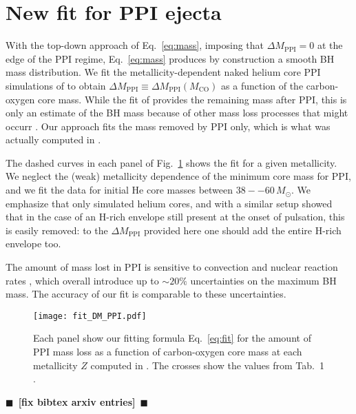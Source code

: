 \documentclass[twocolumn]{aastex63}
\DeclareRobustCommand{\Eqref}[1]{Eq.~\ref{#1}}
\DeclareRobustCommand{\Figref}[1]{Fig.~\ref{#1}}
\newcommand{\todo}[1]{{\large $\blacksquare$~\textbf{\color{red}[#1]}}~$\blacksquare$}
\begin{document}
\section{New fit for PPI ejecta}

With the top-down approach of \Eqref{eq:mass}, imposing that
$\Delta M_\mathrm{PPI}=0$ at the edge of the PPI regime,
\Eqref{eq:mass} produces by construction a smooth BH mass
distribution. We fit the metallicity-dependent naked helium core PPI
simulations of \cite{farmer:19} to obtain
$\Delta M_\mathrm{PPI} \equiv \Delta M_\mathrm{PPI}(M_\mathrm{CO})$ as
a function of the carbon-oxygen core mass. While the fit of
\cite{farmer:19} provides the remaining mass after PPI, this is only
an estimate of the BH mass because of other mass loss processes that
might occurr \citep[e.g.,][]{renzo:20csm, powell:21}. Our approach
fits the mass removed by PPI only, which is what was actually computed
in \cite{farmer:19}.

The dashed curves in each panel of \Figref{fig:fit_DM_PPI} shows the fit
for a given metallicity. We neglect the
(weak) metallicity dependence of the minimum core mass for PPI, and
we fit the data for initial He core masses between $38--60\,M_\odot$.
We emphasize that \cite{farmer:19} only simulated
helium cores, and with a similar setup \cite{renzo:20csm} showed that
in the case of an H-rich envelope still present at the onset of
pulsation, this is easily removed: to the  $\Delta M_\mathrm{PPI}$
provided here one should add the entire H-rich envelope too.

The amount of mass lost in PPI is sensitive to convection
\cite{renzo:20conv} and nuclear reaction rates \cite{farmer:19,
  farmer:20, costa:21, woosley:21, mehta:21}, which overall introduce
up to $\sim{}20\%$ uncertainties on the maximum BH mass. The accuracy
of our fit is comparable to these uncertainties.

\begin{figure}[ht!]
    \begin{centering}
      \texttt{[image: fit\_DM\_PPI.pdf]}
      \caption{Each panel show our fitting formula \Eqref{eq:fit} for
        the amount of PPI mass loss as a function of carbon-oxygen
        core mass at each metallicity $Z$ computed in
        \cite{farmer:19}. The crosses show the values from Tab.~1
        \cite{farmer:19}.}
        \label{fig:fit_DM_PPI}
    \end{centering}
\end{figure}

\todo{fix bibtex arxiv entries}
% 

\end{document}
